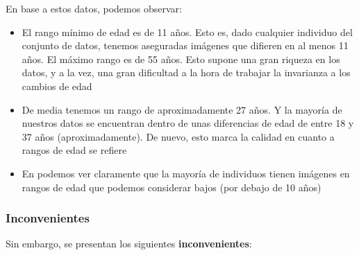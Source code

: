 En base a estos datos, podemos observar:

\begin{itemize}
    \item El rango mínimo de edad es de 11 años. Esto es, dado cualquier individuo del conjunto de datos, tenemos aseguradas imágenes que difieren en al menos 11 años. El máximo rango es de 55 años. Esto supone una gran riqueza en los datos, y a la vez, una gran dificultad a la hora de trabajar la invarianza a los cambios de edad
    \item De media tenemos un rango de aproximadamente 27 años. Y la mayoría de nuestros datos se encuentran dentro de unas diferencias de edad de entre 18 y 37 años (aproximadamente). De nuevo, esto marca la calidad en cuanto a rangos de edad se refiere
    \item En  podemos ver claramente que la mayoría de individuos tienen imágenes en rangos de edad que podemos considerar bajos (por debajo de 10 años)
\end{itemize}

\subsubsection{Inconvenientes} \label{isubsubs:fgnet_inconvenientes}

Sin embargo, se presentan los siguientes \textbf{inconvenientes}:

